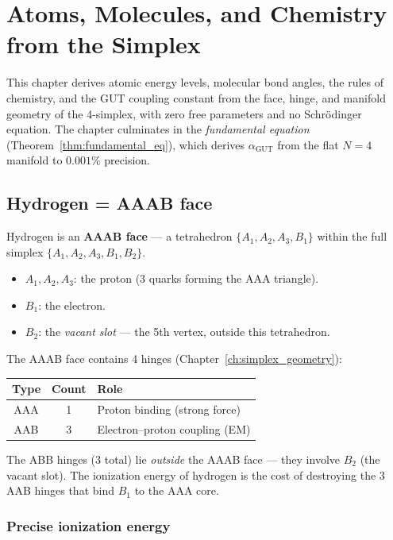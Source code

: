 \section{Atoms, Molecules, and Chemistry from the Simplex}
\label{ch:atoms}

This chapter derives atomic energy levels, molecular bond angles, the rules of chemistry, and the GUT coupling constant from the face, hinge, and manifold geometry of the 4-simplex, with zero free parameters and no Schr\"odinger equation.  The chapter culminates in the \emph{fundamental equation} (Theorem~\ref{thm:fundamental_eq}), which derives $\alpha_\text{GUT}$ from the flat $N=4$ manifold to $0.001\%$ precision.

\subsection{Hydrogen = AAAB face}

Hydrogen is an \textbf{AAAB face} --- a tetrahedron $\{A_1, A_2, A_3, B_1\}$ within the full simplex $\{A_1, A_2, A_3, B_1, B_2\}$.

\begin{itemize}
\item $A_1, A_2, A_3$: the proton (3 quarks forming the AAA triangle).
\item $B_1$: the electron.
\item $B_2$: the \emph{vacant slot} --- the 5th vertex, outside this tetrahedron.
\end{itemize}

The AAAB face contains 4 hinges (Chapter~\ref{ch:simplex_geometry}):
\begin{center}
\begin{tabular}{ccl}
\hline
Type & Count & Role \\
\hline
AAA & 1 & Proton binding (strong force) \\
AAB & 3 & Electron--proton coupling (EM) \\
\hline
\end{tabular}
\end{center}

The ABB hinges (3 total) lie \emph{outside} the AAAB face --- they involve $B_2$ (the vacant slot). The ionization energy of hydrogen is the cost of destroying the 3 AAB hinges that bind $B_1$ to the AAA core.

\subsubsection{Precise ionization energy}

